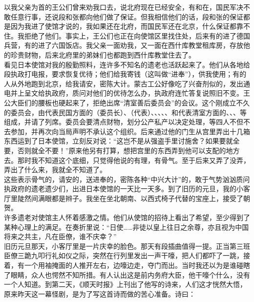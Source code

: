 以我父亲为首的王公们曾来劝我口去，说北府现在已经安全，有和在，国民军决不敢任意行事，还说段和张都向他们做了保证。但我相信他们的话，段和张的保证都是因为我进了使馆才说的，我如果还在北府，而国民军还在北京，什么保证都靠不住。我拒绝了他们。事实上，王公们也正在向使馆区里找住处，后来有的进了德国兵营，有的进了六国饭店。我父亲一面劝我，又一面在西什库教堂租库房，存放他的珍贵财物，后来北府里的弟妹们也都跑到西什库教堂住去了。\\

看见日本使馆对我的殷勤照料，连许多不知名的遗老也活跃起来了。他们从各地给段执政打电报，要求恢复优待；他们给我寄钱（这叫做“进奉”），供我使用；有的人从外地跑到北京，给我请安，密陈大计。蒙古工公好像吃了兴奋剂似的，发出通电并上呈文给执政府，质问对他们的优待怎么办，执政府连忙答复说照旧不变。王公大臣们的腰板也硬起来了，拒绝出席“清室善后委员会”的会议。这个刚成立不久的委员会，由代表民国方面的（委员长）、（代表）、、、、、和代表清室方面的、、、等组成，并请了列席。委员会要清点财物，划分公产私产以决定处理，等四人不但不去参加，并再次向当局声明不承认这个组织。后来通过他的门生从宫里弄出十几箱东西运到了日本使馆，立刻反对说：“这岂不是从强盗手里讨施舍？如果要就全要，否则就全不要！”原来他另有打算，想把宫里的东西弄到他可以支配的地方去。那时我不知道这个底细，只觉得他说的有理，有骨气。至于后来又弄了没弄，弄出了什么来，我就全不知道了。\\

这些表示骨气的，请安的，送进奉的，密陈各种“中兴大计”的，敢于气势汹汹质问执政府的遗老遗少们，出进日本使馆的一天比一天多。到了旧历的元旦，我的小客厅里陡然间满眼都是辫子。我坐在坐北朝南、以西式椅子代替的宝座上，接受了朝贺。\\

许多遗老对使馆主人怀着感激之情。他们从使馆的招待上看出了希望，至少得到了某种心理上的满足。在奏折里说：“日使……非徒以皇上往日之余尊，亦且视为中国将来之共主，凡在臣僚，谁不庆幸？”\\

旧历元旦那天，小客厅里是一片庆幸的脸色。那天有段插曲值得一提。正当第三班臣僚三跪九叩行礼如仪之际，突然在行列里发出一声干嚎，把人们都吓了一跳，接着，有一个用袖掩面的人推开左右，边嚎边走，夺门而出。当时我还以为是谁碰瞎了眼睛，众人也愕然不知所措。有人认出这是前内务府大臣，他干嚎个什么，没有一个人知道。到第二天，《顺天时报》上刊出了他写的诗来，人们这才恍然大悟，原来昨天这一幕怪剧，是为了写这首诗而做的苦心准备。诗曰：\\


